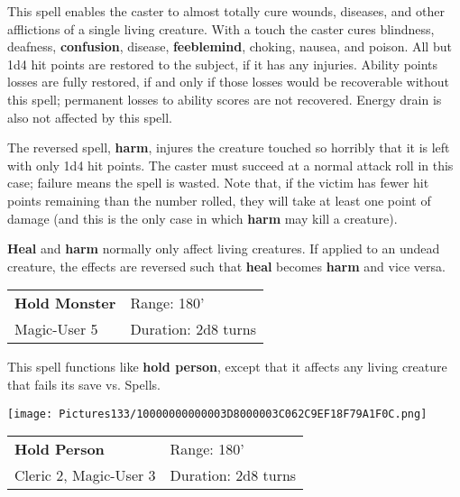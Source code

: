 \documentclass[a4paper,twoside,openany,10pt]{book}
\begin{document}
\begin{multicols}{2}
This spell enables the caster to almost totally cure wounds, diseases, and other afflictions of a single living creature. With a touch the caster cures blindness, deafness, \textbf{confusion}, disease, \textbf{feeblemind}, choking, nausea, and poison. All but 1d4 hit points are restored to the subject, if it has any injuries. Ability points losses are fully restored, if and only if those losses would be recoverable without this spell; permanent losses to ability scores are not recovered. Energy drain is also not affected by this spell.

The reversed spell, \textbf{harm}, injures the creature touched so horribly that it is left with only 1d4 hit points. The caster must succeed at a normal attack roll in this case; failure means the spell is wasted. Note that, if the victim has fewer hit points remaining than the number rolled, they will take at least one point of damage (and this is the only case in which \textbf{harm} may kill a creature).

\textbf{Heal} and \textbf{harm} normally only affect living creatures. If applied to an undead creature, the effects are reversed such that \textbf{heal} becomes \textbf{harm} and vice versa.


\smallskip\begin{flushleft} 
	\begin{tabularx}{0.45\textwidth}{@{}m{3.5cm}m{5.5cm}@{}} 
		\textbf{Hold Monster} & Range: 180'\\
Magic-User 5 &Duration: 2d8 turns\\
	\end{tabularx}\end{flushleft}

This spell functions like \textbf{hold person}, except that it affects any living creature that fails its save vs. Spells.


\begin{flushleft}
	\texttt{[image: Pictures133/10000000000003D8000003C062C9EF18F79A1F0C.png]}
\end{flushleft}


\smallskip\begin{flushleft} 
	\begin{tabularx}{0.45\textwidth}{@{}m{3.5cm}m{5.5cm}@{}} 
		\textbf{Hold Person} & Range: 180'\\
Cleric 2, Magic-User 3 & Duration: 2d8 turns\\
	\end{tabularx}\end{flushleft}


\end{multicols}
\end{document}
